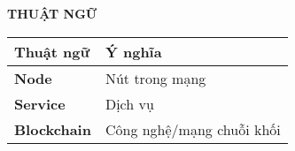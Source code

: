 \documentclass[../DoAn.tex]{subfiles}
\begin{document}
\begin{center}
	\Large{\textbf{THUẬT NGỮ}}\\
\end{center}
\begin{longtable}{l p{14cm}}
	\hline
	\textbf{Thuật ngữ}  & \textbf{Ý nghĩa}          \\ \hline
	\textbf{Node}       & Nút trong mạng            \\
	\textbf{Service}    & Dịch vụ                   \\
	\textbf{Blockchain} & Công nghệ/mạng chuỗi khối \\
	\hline
\end{longtable}
\end{document}
